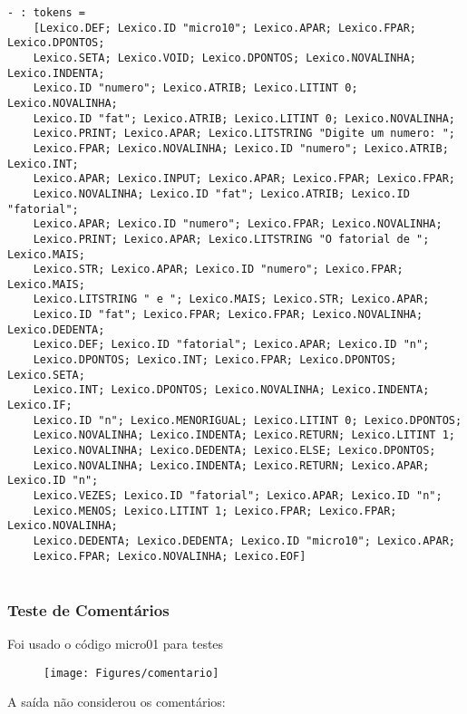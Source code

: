 \documentclass[hidelinks,12pt]{article}
\begin{document}
	\begin{lstlisting}[caption=Analisador Léxico]
	- : tokens =
	[Lexico.DEF; Lexico.ID "micro10"; Lexico.APAR; Lexico.FPAR; Lexico.DPONTOS;
	Lexico.SETA; Lexico.VOID; Lexico.DPONTOS; Lexico.NOVALINHA; Lexico.INDENTA;
	Lexico.ID "numero"; Lexico.ATRIB; Lexico.LITINT 0; Lexico.NOVALINHA;
	Lexico.ID "fat"; Lexico.ATRIB; Lexico.LITINT 0; Lexico.NOVALINHA;
	Lexico.PRINT; Lexico.APAR; Lexico.LITSTRING "Digite um numero: ";
	Lexico.FPAR; Lexico.NOVALINHA; Lexico.ID "numero"; Lexico.ATRIB; Lexico.INT;
	Lexico.APAR; Lexico.INPUT; Lexico.APAR; Lexico.FPAR; Lexico.FPAR;
	Lexico.NOVALINHA; Lexico.ID "fat"; Lexico.ATRIB; Lexico.ID "fatorial";
	Lexico.APAR; Lexico.ID "numero"; Lexico.FPAR; Lexico.NOVALINHA;
	Lexico.PRINT; Lexico.APAR; Lexico.LITSTRING "O fatorial de "; Lexico.MAIS;
	Lexico.STR; Lexico.APAR; Lexico.ID "numero"; Lexico.FPAR; Lexico.MAIS;
	Lexico.LITSTRING " e "; Lexico.MAIS; Lexico.STR; Lexico.APAR;
	Lexico.ID "fat"; Lexico.FPAR; Lexico.FPAR; Lexico.NOVALINHA; Lexico.DEDENTA;
	Lexico.DEF; Lexico.ID "fatorial"; Lexico.APAR; Lexico.ID "n";
	Lexico.DPONTOS; Lexico.INT; Lexico.FPAR; Lexico.DPONTOS; Lexico.SETA;
	Lexico.INT; Lexico.DPONTOS; Lexico.NOVALINHA; Lexico.INDENTA; Lexico.IF;
	Lexico.ID "n"; Lexico.MENORIGUAL; Lexico.LITINT 0; Lexico.DPONTOS;
	Lexico.NOVALINHA; Lexico.INDENTA; Lexico.RETURN; Lexico.LITINT 1;
	Lexico.NOVALINHA; Lexico.DEDENTA; Lexico.ELSE; Lexico.DPONTOS;
	Lexico.NOVALINHA; Lexico.INDENTA; Lexico.RETURN; Lexico.APAR; Lexico.ID "n";
	Lexico.VEZES; Lexico.ID "fatorial"; Lexico.APAR; Lexico.ID "n";
	Lexico.MENOS; Lexico.LITINT 1; Lexico.FPAR; Lexico.FPAR; Lexico.NOVALINHA;
	Lexico.DEDENTA; Lexico.DEDENTA; Lexico.ID "micro10"; Lexico.APAR;
	Lexico.FPAR; Lexico.NOVALINHA; Lexico.EOF]
	
	\end{lstlisting}
	
	
	
	\subsubsection{Teste de Comentários}
	
	Foi usado o código micro01 para testes
	
	\begin{figure}[!h]
		\centering 
		\texttt{[image: Figures/comentario]}
	\end{figure}
	
	\newpage
	A saída não considerou os comentários:
	
\end{document}

